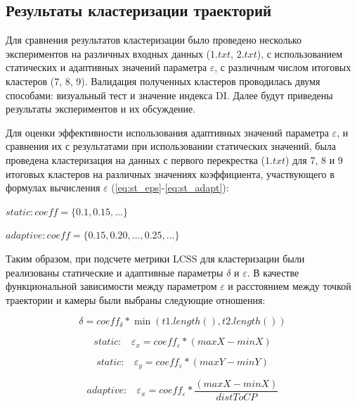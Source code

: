 \subsection{Результаты кластеризации траекторий}

Для сравнения результатов кластеризации было проведено несколько экспериментов на различных входных данных ($1.txt$, $2.txt$), с использованием статических и адаптивных значений параметра $\varepsilon$, с различным числом итоговых кластеров (7, 8, 9). Валидация полученных кластеров проводилась двумя способами: визуальный тест и значение индекса DI. Далее будут приведены результаты экспериментов и их обсуждение.

Для оценки эффективности использования адаптивных значений параметра $\varepsilon$, и сравнения их с результатами при использовании статических значений, была проведена кластеризация на данных с первого перекрестка ($1.txt$) для 7, 8 и 9 итоговых кластеров на различных значениях коэффициента, участвующего в формулах вычисления $\varepsilon$ (\ref{eq:st_eps}-\ref{eq:st_adapt}):

$static: coeff = \{\bm{0.1}, \bm{0.15}, \ldots\}$

$adaptive: coeff = \{0.15, \bm{0.20}, \ldots, 0.25, \ldots\}$

Таким образом, при подсчете метрики LCSS для кластеризации были реализованы статические и адаптивные параметры $\delta$ и $\varepsilon$. В качестве функциональной зависимости между параметром $\varepsilon$ и расстоянием между точкой траектории и камеры были выбраны следующие отношения:

\begin{equation} \label{eq:delta-adapt}
	\delta = coeff_\delta * \min{(t1.length(), t2.length())}
\end{equation}

\begin{equation} \label{eq:epsX-st}
	static:\ \ \ \ \varepsilon_x = coeff_\varepsilon * (maxX - minX)
\end{equation}

\begin{equation} \label{eq:epsY-st}
	static:\ \ \ \ \varepsilon_y = coeff_\varepsilon * (maxY - minY)
\end{equation}

\begin{equation} \label{eq:epsX-adapt}
	adaptive:\ \ \ \ \varepsilon_x = coeff_\varepsilon * \frac{(maxX - minX)}{distToCP}
\end{equation}

